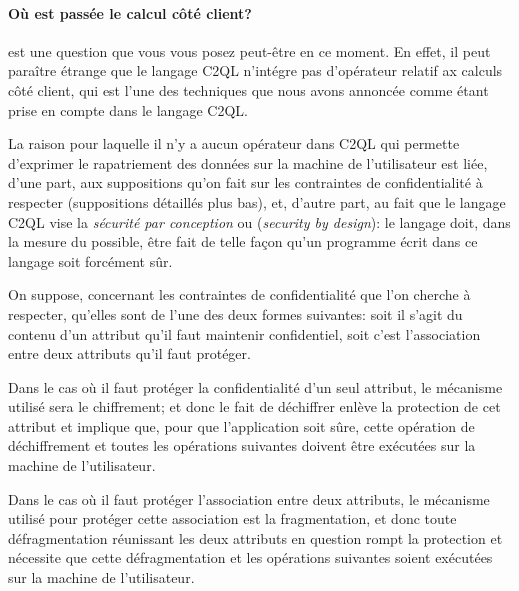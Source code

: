 \paragraph{\og Où est passée le calcul côté client?\fg{}}
est une question que vous vous posez peut-être en ce moment.
En effet, il peut paraître étrange que le langage
C2QL n'intégre pas d'opérateur relatif
ax calculs côté client, qui est l'une des techniques
que nous avons annoncée comme étant prise en compte
dans le langage C2QL.

La raison pour laquelle il n'y a aucun opérateur dans C2QL 
qui permette d'exprimer le rapatriement des données sur la machine de l'utilisateur
est liée, d'une part, aux suppositions qu'on fait sur les contraintes
de confidentialité à respecter
(suppositions détaillés plus bas), et,
d'autre part, au fait que
le langage C2QL vise la \emph{sécurité par 
	conception} ou (\emph{security by design}):
le langage doit, dans la mesure du possible,
 être fait de telle façon
qu'un programme écrit dans ce langage soit forcément
sûr.

On suppose, concernant les contraintes de confidentialité
que l'on cherche à respecter, qu'elles sont de l'une des
deux formes suivantes: soit il s'agit du contenu d'un
attribut qu'il faut maintenir confidentiel,
soit c'est l'association entre deux attributs
qu'il faut protéger.

Dans le cas où il faut protéger la confidentialité
d'un seul attribut, le mécanisme utilisé
sera le chiffrement; et donc le fait
de déchiffrer enlève la protection de cet
attribut et implique que, pour que l'application soit
sûre, cette opération de déchiffrement 
et toutes les opérations suivantes doivent être exécutées
sur la machine de l'utilisateur.

Dans le cas où il faut protéger l'association entre deux 
attributs, le mécanisme utilisé
pour protéger cette association est la fragmentation,
et donc toute défragmentation réunissant les deux attributs
en question rompt la protection et nécessite 
que cette défragmentation et les opérations suivantes
soient exécutées sur la machine de l'utilisateur.


